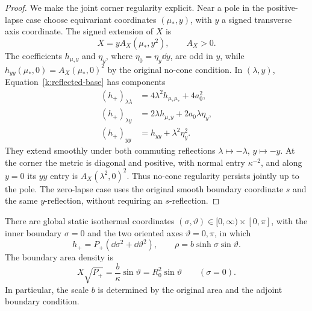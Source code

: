 \begin{proof}
We make the joint corner regularity explicit. Near a pole in
the positive-lapse case choose equivariant coordinates
\((\mu_*,y)\), with \(y\) a signed transverse axis coordinate. The signed
extension of \(X\) is
\[
 X=yA_X(\mu_*,y^2),\qquad A_X>0.
\]
The coefficients \(h_{\mu_*y}\) and \(\eta_y\), where
\(\eta_0=\eta_y\dd y\), are odd in \(y\), while
\(h_{yy}(\mu_*,0)=A_X(\mu_*,0)^2\) by the original no-cone
condition. In \((\lambda,y)\), Equation~\eqref{k:reflected-base}
has components
\[
 \begin{split}
 (h_+)_{\lambda\lambda}&=4\lambda^2h_{\mu_*\mu_*}+4a_0^2,\\
 (h_+)_{\lambda y}&=2\lambda h_{\mu_*y}+2a_0\lambda\eta_y,\\
 (h_+)_{yy}&=h_{yy}+\lambda^2\eta_y^2.
 \end{split}
\]
They extend smoothly under both commuting reflections
\(\lambda\mapsto-\lambda\), \(y\mapsto-y\).
At the corner the metric is diagonal and positive, with normal
entry \(\kappa^{-2}\), and along \(y=0\) its \(yy\) entry is
\(A_X(\lambda^2,0)^2\). Thus no-cone regularity persists jointly
up to the pole. The zero-lapse case uses the original smooth
boundary coordinate \(s\) and the same \(y\)-reflection, without
requiring an \(s\)-reflection.
\end{proof}

\begin{lemma}\label{k:rod-scale}
There are global static isothermal coordinates
\((\sigma,\vartheta)\in[0,\infty)\times[0,\pi]\), with the inner
boundary \(\sigma=0\) and the two oriented axes
\(\vartheta=0,\pi\), in which
\begin{equation}\label{k:rho}
 h_+=P_+(\dd\sigma^2+\dd\vartheta^2),\qquad
 \rho=b\sinh\sigma\sin\vartheta .
\end{equation}
The boundary area density is
\begin{equation}\label{k:area-density}
 X\sqrt{P_+}=\frac b\kappa\sin\vartheta
                 =R_0^2\sin\vartheta\qquad(\sigma=0).
\end{equation}
In particular, the scale \(b\) is determined by the original area
and the adjoint boundary condition.
\end{lemma}

